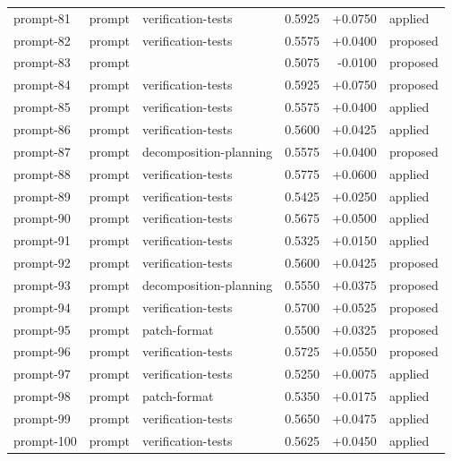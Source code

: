 \begin{center}
\begin{longtable}{llp{5.2cm}rrl}
prompt-81 & prompt & verification-tests & 0.5925 & +0.0750 & applied \\
prompt-82 & prompt & verification-tests & 0.5575 & +0.0400 & proposed \\
prompt-83 & prompt &  & 0.5075 & -0.0100 & proposed \\
prompt-84 & prompt & verification-tests & 0.5925 & +0.0750 & proposed \\
prompt-85 & prompt & verification-tests & 0.5575 & +0.0400 & applied \\
prompt-86 & prompt & verification-tests & 0.5600 & +0.0425 & applied \\
prompt-87 & prompt & decomposition-planning & 0.5575 & +0.0400 & proposed \\
prompt-88 & prompt & verification-tests & 0.5775 & +0.0600 & applied \\
prompt-89 & prompt & verification-tests & 0.5425 & +0.0250 & applied \\
prompt-90 & prompt & verification-tests & 0.5675 & +0.0500 & applied \\
prompt-91 & prompt & verification-tests & 0.5325 & +0.0150 & applied \\
prompt-92 & prompt & verification-tests & 0.5600 & +0.0425 & proposed \\
prompt-93 & prompt & decomposition-planning & 0.5550 & +0.0375 & proposed \\
prompt-94 & prompt & verification-tests & 0.5700 & +0.0525 & proposed \\
prompt-95 & prompt & patch-format & 0.5500 & +0.0325 & proposed \\
prompt-96 & prompt & verification-tests & 0.5725 & +0.0550 & proposed \\
prompt-97 & prompt & verification-tests & 0.5250 & +0.0075 & applied \\
prompt-98 & prompt & patch-format & 0.5350 & +0.0175 & applied \\
prompt-99 & prompt & verification-tests & 0.5650 & +0.0475 & applied \\
prompt-100 & prompt & verification-tests & 0.5625 & +0.0450 & applied \\
\bottomrule\end{longtable}\end{center}
\clearpage
